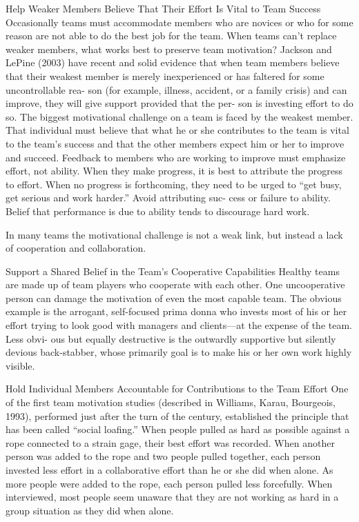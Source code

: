 Help Weaker Members Believe That Their Effort Is Vital to Team Success
Occasionally teams must accommodate members who are novices or who for some reason are not able to do the best job for the team. When teams can’t replace weaker members, what works best to preserve team motivation? Jackson and LePine (2003) have recent and solid evidence that when team members believe that their weakest member is merely inexperienced or has faltered for some uncontrollable rea- son (for example, illness, accident, or a family crisis) and can improve, they will give support provided that the per- son is investing effort to do so.
The biggest motivational challenge on a team is faced by the weakest member. That individual must believe that what he or she contributes to the team is vital to the team’s success and that the other members expect him or her to improve and succeed. Feedback to members who are working to improve must emphasize effort, not ability. When they make progress, it is best to attribute the progress to effort. When no progress is forthcoming, they need to be urged to “get busy, get serious and work harder.” Avoid attributing suc- cess or failure to ability. Belief that performance is due to ability tends to discourage hard work.

In many teams the motivational challenge is not a weak link, but instead a lack of cooperation and collaboration.

Support a Shared Belief in the Team’s Cooperative Capabilities
Healthy teams are made up of team players who cooperate with each other. One uncooperative person can damage the motivation of even the most capable team. The obvious example is the arrogant, self-focused prima donna who invests most of his or her effort trying to look good with managers and clients—at the expense of the team. Less obvi- ous but equally destructive is the outwardly supportive but silently devious back-stabber, whose primarily goal is to make his or her own work highly visible.

Hold Individual Members Accountable for Contributions to the Team Effort One of the first team motivation studies (described in Williams, Karau, Bourgeois, 1993), performed just after the turn of the century, established the principle that has been called “social loafing.” When people pulled as hard as possible against a rope connected to a strain gage, their best effort was recorded. When another person was added to the rope and two people pulled together, each person invested less effort in a collaborative effort than he or she did when alone. As more people were added to the rope, each person pulled less forcefully. When interviewed, most people seem unaware that they are not working as hard in a group situation as they did when alone.

